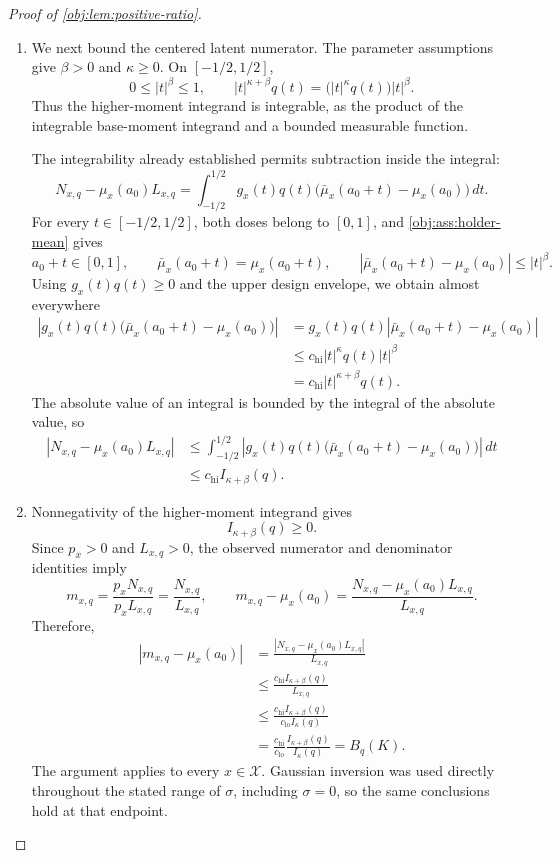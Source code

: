 \documentclass[11pt]{article}
\begin{document}
\begin{proof}[Proof of \cref{obj:lem:positive-ratio}]
\begin{enumerate}
\item We next bound the centered latent numerator. The parameter assumptions give \(\beta>0\) and \(\kappa\ge0\). On \([-1/2,1/2]\),
\[
0\le |t|^\beta\le1,
\qquad
|t|^{\kappa+\beta}q(t)
=
\bigl(|t|^\kappa q(t)\bigr)|t|^\beta.
\]
Thus the higher-moment integrand is integrable, as the product of the integrable base-moment integrand and a bounded measurable function.

The integrability already established permits subtraction inside the integral:
\[
N_{x,q}-\mu_x(a_0)L_{x,q}
=
\int_{-1/2}^{1/2}
g_x(t)q(t)\bigl(\bar\mu_x(a_0+t)-\mu_x(a_0)\bigr)\,dt.
\]
For every \(t\in[-1/2,1/2]\), both doses belong to \([0,1]\), and \cref{obj:ass:holder-mean} gives
\[
a_0+t\in[0,1],
\qquad
\bar\mu_x(a_0+t)=\mu_x(a_0+t),
\qquad
|\bar\mu_x(a_0+t)-\mu_x(a_0)|\le |t|^\beta.
\]
Using \(g_x(t)q(t)\ge0\) and the upper design envelope, we obtain almost everywhere
\[
\begin{aligned}
\left|g_x(t)q(t)
\bigl(\bar\mu_x(a_0+t)-\mu_x(a_0)\bigr)\right|
&=g_x(t)q(t)
|\bar\mu_x(a_0+t)-\mu_x(a_0)|\\
&\le c_{\mathrm{hi}}|t|^\kappa q(t)|t|^\beta\\
&=c_{\mathrm{hi}}|t|^{\kappa+\beta}q(t).
\end{aligned}
\]
The absolute value of an integral is bounded by the integral of the absolute value, so
\[
\begin{aligned}
|N_{x,q}-\mu_x(a_0)L_{x,q}|
&\le
\int_{-1/2}^{1/2}
\left|g_x(t)q(t)
\bigl(\bar\mu_x(a_0+t)-\mu_x(a_0)\bigr)\right|\,dt\\
&\le c_{\mathrm{hi}}I_{\kappa+\beta}(q).
\end{aligned}
\]

\item Nonnegativity of the higher-moment integrand gives
\[
I_{\kappa+\beta}(q)\ge0.
\]
Since \(p_x>0\) and \(L_{x,q}>0\), the observed numerator and denominator identities imply
\[
m_{x,q}
=\frac{p_xN_{x,q}}{p_xL_{x,q}}
=\frac{N_{x,q}}{L_{x,q}},
\qquad
m_{x,q}-\mu_x(a_0)
=
\frac{N_{x,q}-\mu_x(a_0)L_{x,q}}{L_{x,q}}.
\]
Therefore,
\[
\begin{aligned}
|m_{x,q}-\mu_x(a_0)|
&=\frac{|N_{x,q}-\mu_x(a_0)L_{x,q}|}{L_{x,q}}\\
&\le\frac{c_{\mathrm{hi}}I_{\kappa+\beta}(q)}{L_{x,q}}\\
&\le\frac{c_{\mathrm{hi}}I_{\kappa+\beta}(q)}{c_{\mathrm{lo}}I_\kappa(q)}\\
&=\frac{c_{\mathrm{hi}}}{c_{\mathrm{lo}}}
\frac{I_{\kappa+\beta}(q)}{I_\kappa(q)}
=B_q(K).
\end{aligned}
\]
The argument applies to every \(x\in\mathcal X\). Gaussian inversion was used directly throughout the stated range of \(\sigma\), including \(\sigma=0\), so the same conclusions hold at that endpoint.
\end{enumerate}
\end{proof}
\end{document}
